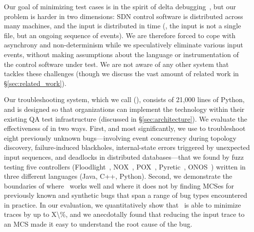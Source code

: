 Our goal of minimizing test cases is in the spirit of
delta debugging~\cite{Zeller:1999:YMP:318773.318946}, but our
problem is harder in two dimensions: SDN control software is distributed
across many machines, and the input is distributed in time (\ie, the
input is not a single file, but an ongoing sequence of events).
We are therefore forced to cope with asynchrony and non-determinism while
we speculatively eliminate various input events,
without making assumptions about the language
or instrumentation of the control software under test.
We are not aware of any other system that tackles these
challenges (though we discuss the vast amount of related work in \S\ref{sec:related_work}).

Our troubleshooting system, which we call {\projectname} ({\projectmeaning}),
consists of 21,000 lines of Python, and is designed so that organizations can
implement the technology within their existing QA test infrastructure (discussed in
\S\ref{sec:architecture}). We evaluate the effectiveness of {\projectname} in
two ways. First, and most significantly, we use {\projectname} to troubleshoot
\num{eight} previously unknown bugs---involving event concurrency during topology discovery,
failure-induced blackholes, internal-state errors triggered by unexpected
input sequences, and deadlocks in distributed databases---that we found
by fuzz testing \num{five} controllers (Floodlight~\cite{floodlight}, NOX~\cite{nox},
POX~\cite{pox}, Pyretic~\cite{frenetic}, ONOS~\cite{ONOS})
written in three different languages (Java, C++, Python).
Second, we demonstrate the
boundaries of where \projectname~works well and where it does not by
finding MCSes for previously known and synthetic bugs that span a range of bug types encountered in
practice. In our evaluation, we quantitatively show that \projectname~is able to minimize traces
by up to \num{X\%}, and we anecdotally found that reducing
the input trace to an MCS made it easy to understand the root cause of the bug.
